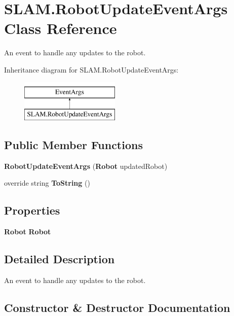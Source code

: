 \section{S\-L\-A\-M.\-Robot\-Update\-Event\-Args Class Reference}
\label{class_s_l_a_m_1_1_robot_update_event_args}


An event to handle any updates to the robot.  


Inheritance diagram for S\-L\-A\-M.\-Robot\-Update\-Event\-Args\-:\begin{figure}[H]
\begin{center}
\leavevmode
\includegraphics[height=2.000000cm]{class_s_l_a_m_1_1_robot_update_event_args}
\end{center}
\end{figure}
\subsection*{Public Member Functions}
\begin{DoxyCompactItemize}
\item 
{\bf Robot\-Update\-Event\-Args} ({\bf Robot} updated\-Robot)
\item 
override string {\bf To\-String} ()
\end{DoxyCompactItemize}
\subsection*{Properties}
\begin{DoxyCompactItemize}
\item 
{\bf Robot} {\bf Robot}\hspace{0.3cm}{\ttfamily  [get]}
\end{DoxyCompactItemize}


\subsection{Detailed Description}
An event to handle any updates to the robot. 



\subsection{Constructor \& Destructor Documentation}
